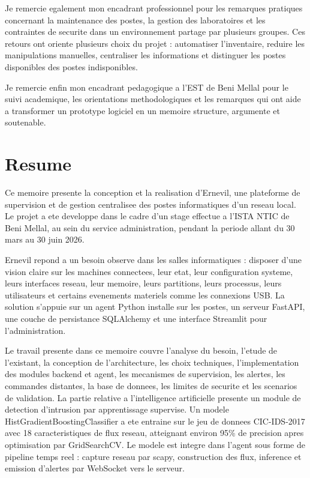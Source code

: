 \documentclass[12pt,a4paper]{report}
\begin{document}
Je remercie egalement mon encadrant professionnel pour les remarques pratiques concernant la maintenance des postes, la gestion des laboratoires et les contraintes de securite dans un environnement partage par plusieurs groupes. Ces retours ont oriente plusieurs choix du projet : automatiser l'inventaire, reduire les manipulations manuelles, centraliser les informations et distinguer les postes disponibles des postes indisponibles.

Je remercie enfin mon encadrant pedagogique a l'EST de Beni Mellal pour le suivi academique, les orientations methodologiques et les remarques qui ont aide a transformer un prototype logiciel en un memoire structure, argumente et soutenable.

\chapter*{Resume}
Ce memoire presente la conception et la realisation d'Ernevil, une plateforme de supervision et de gestion centralisee des postes informatiques d'un reseau local. Le projet a ete developpe dans le cadre d'un stage effectue a l'ISTA NTIC de Beni Mellal, au sein du service administration, pendant la periode allant du 30 mars au 30 juin 2026.

Ernevil repond a un besoin observe dans les salles informatiques : disposer d'une vision claire sur les machines connectees, leur etat, leur configuration systeme, leurs interfaces reseau, leur memoire, leurs partitions, leurs processus, leurs utilisateurs et certains evenements materiels comme les connexions USB. La solution s'appuie sur un agent Python installe sur les postes, un serveur FastAPI, une couche de persistance SQLAlchemy et une interface Streamlit pour l'administration.

Le travail presente dans ce memoire couvre l'analyse du besoin, l'etude de l'existant, la conception de l'architecture, les choix techniques, l'implementation des modules backend et agent, les mecanismes de supervision, les alertes, les commandes distantes, la base de donnees, les limites de securite et les scenarios de validation. La partie relative a l'intelligence artificielle presente un module de detection d'intrusion par apprentissage supervise. Un modele HistGradientBoostingClassifier a ete entraine sur le jeu de donnees CIC-IDS-2017 avec 18 caracteristiques de flux reseau, atteignant environ 95\% de precision apres optimisation par GridSearchCV. Le modele est integre dans l'agent sous forme de pipeline temps reel : capture reseau par scapy, construction des flux, inference et emission d'alertes par WebSocket vers le serveur.
\end{document}

